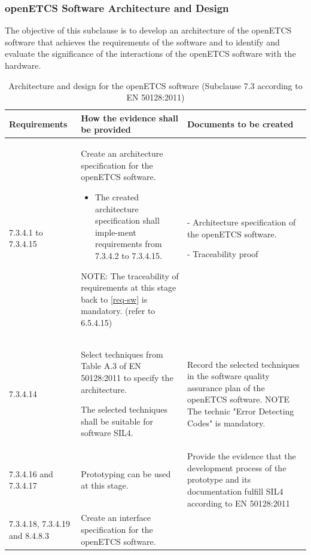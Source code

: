 \documentclass{template/openetcs_report}
\begin{document}
\subsubsection{openETCS Software Architecture and Design}
\label{arc-sw}
\begin{flushleft}
The objective of this subclause is to develop an architecture of the openETCS software that achieves the requirements of the software and to identify and evaluate the significance of the interactions of the openETCS software with the hardware.
\end{flushleft}
{\footnotesize\sffamily\centering
\begin{longtable}{|p{2cm}|p{9cm}|p{3cm}|}
\caption{Architecture and design for the openETCS software (Subclause 7.3 according to EN 50128:2011)}\\
\hline
\bfseries Requirements & \bfseries How the evidence shall be provided & \bfseries Documents to be created\\
\hline
\hline
\endhead
\hline
\endfoot

7.3.4.1 to 7.3.4.15 & Create an architecture specification for the openETCS software.
\begin{itemize}\itemsep=0pt
  \item The created architecture specification shall imple-ment requirements from 7.3.4.2 to 7.3.4.15.
\end{itemize}
NOTE: \linebreak
The traceability of requirements at this stage back to \ref{req-sw} is mandatory. (refer to 6.5.4.15)
& - Architecture specification of the openETCS software.

- Traceability proof\\ 
\hline
7.3.4.14 & Select techniques from Table A.3 of EN 50128:2011 to specify the architecture.

The selected techniques shall be suitable for software SIL4.
& Record the selected techniques in the software quality assurance plan of the openETCS software.
\linebreak
\linebreak
NOTE\linebreak
The technic "Error Detecting Codes" is mandatory.\\ 
\hline
7.3.4.16 and 7.3.4.17 & Prototyping can be used at this stage.
& Provide the evidence that the development process of the prototype and its documentation fulfill SIL4 according to EN 50128:2011\\ 
\hline
7.3.4.18, 7.3.4.19 and 8.4.8.3 & Create an interface specification for the openETCS software.
 

\end{longtable}}
\end{document}
